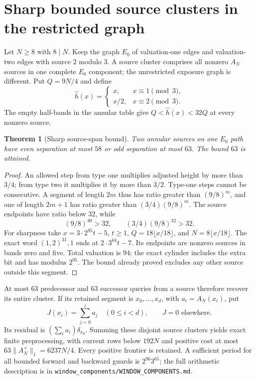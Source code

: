 \documentclass[11pt]{article}
\newtheorem{theorem}{Theorem}
\begin{document}
\section{Sharp bounded source clusters in the restricted graph}
Let $N\ge8$ with $8\mid N$. Keep the graph $E_0$ of valuation-one edges and valuation-two edges
with source $2$ modulo $3$. A source cluster comprises all nonzero
$A_N$ sources in one complete $E_0$ component; the unrestricted
exposure graph is different. Put $Q=9N/4$ and define
\[
\widehat h(x)=
\begin{cases}x,&x\equiv1\pmod3,\\x/2,&x\equiv2\pmod3.\end{cases}
\]
The empty half-bands in the annular table give
$Q<\widehat h(x)<32Q$ at every nonzero source.

\begin{theorem}[Sharp source-span bound]
Two annular sources on one $E_0$ path have even separation at most
$58$ or odd separation at most $63$. The bound $63$ is attained.
\end{theorem}
\begin{proof}
An allowed step from type one multiplies adjusted height by more than
$3/4$; from type two it multiplies it by more than $3/2$.
Type-one steps cannot be consecutive. A segment of length $2m$ thus
has ratio greater than $(9/8)^m$, and one of length $2m+1$ has ratio
greater than $(3/4)(9/8)^m$. The source endpoints have ratio below $32$,
while
\[
(9/8)^{30}>32,\qquad
(3/4)(9/8)^{32}>32.
\]
For sharpness take $x=3\cdot2^{95}t-5$, $t\ge1$,
$Q=18\lfloor x/18\rfloor$, and $N=8\lfloor x/18\rfloor$.
The exact word $(1,2)^{31},1$ ends at
$2\cdot3^{64}t-7$. Its endpoints are nonzero sources in bands zero
and five. Total valuation is $94$; the exact cylinder includes the
extra bit and has modulus $2^{95}$. The bound already proved excludes
any other source outside this segment.
\end{proof}
At most $63$ predecessor and $63$ successor queries from a source
therefore recover its entire cluster. If its retained segment is
$x_0,\ldots,x_d$, with $a_i=A_N(x_i)$, put
\[
J(x_i)=\sum_{j=0}^i a_j\quad(0\le i<d),\qquad J=0
\text{ elsewhere}.
\]
Its residual is $(\sum_i a_i)\delta_{x_d}$. Summing these disjoint
source clusters yields exact finite preprocessing, with current rows
below $192N$ and positive cost at most
$63\|A_N^+\|_1=6237N/4$. Every positive frontier is retained.
A sufficient period for all bounded forward and backward guards is
$2^{96}3^{65}$; the full arithmetic description is in
\texttt{window\_components/WINDOW\_COMPONENTS.md}.
\end{document}
